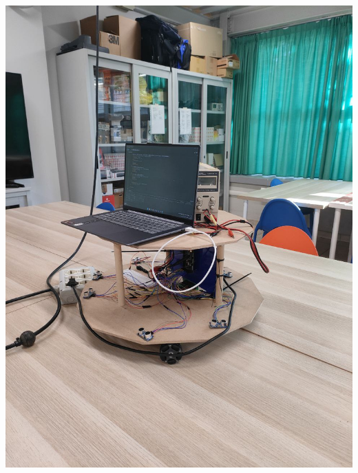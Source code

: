 \documentclass{article}
\begin{document}
\begin{minipage}[t]{0.5\textwidth}
  \includegraphics[width=0.9\linewidth]{photos/3.jpg}
\end{minipage}
\hfill
\end{document}

